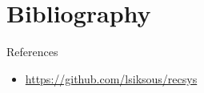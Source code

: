 \documentclass[french]{beamer}
\begin{document}
\section{Bibliography}
\label{sec:org04ca828}
\begin{frame}[label={sec:org4e90d95}]{References}
\begin{itemize}
\item \url{https://github.com/lsiksous/recsys}
\end{itemize}



\end{frame}
\end{document}
